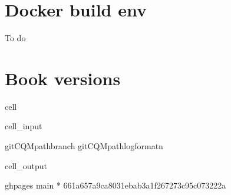\documentclass[letterpaper,table,10pt,english]{jupyterBook}
\begin{document}
\section{Docker build env}
\label{\detokenize{tests/build_versions_checks:docker-build-env}}
\sphinxAtStartPar
To do


\section{Book versions}
\label{\detokenize{tests/build_versions_checks:book-versions}}
\begin{sphinxuseclass}{cell}\begin{sphinxVerbatimInput}

\begin{sphinxuseclass}{cell_input}
\begin{sphinxVerbatim}[commandchars=\\\{\}]
  
git\PYGZhy{}CQMpathbranch
git\PYGZhy{}CQMpathlog\PYGZhy{}\PYGZhy{}format\PYGZhy{}n
\end{sphinxVerbatim}

\end{sphinxuseclass}\end{sphinxVerbatimInput}
\begin{sphinxVerbatimOutput}

\begin{sphinxuseclass}{cell_output}
\begin{sphinxVerbatim}[commandchars=\\\{\}]
  gh\PYGZhy{}pages
  main
* 
661a657a9ca8031ebab3a1f267273c95c073222a
\end{sphinxVerbatim}

\end{sphinxuseclass}\end{sphinxVerbatimOutput}

\end{sphinxuseclass}
\end{document}
